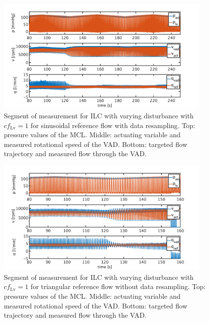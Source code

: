 \begin{figure}[ht!]
  \centering
  \includegraphics[width=0.95\textwidth]{images/chapt_5/ILC/ilc_var_dist_fix_sine.pdf}
  \caption[Segment of measurement for ILC with varying disturbance with $cf_{\mathrm{Lv}}=1$ for sinusoidal reference flow with data resampling]{Segment of measurement for ILC with varying disturbance with $cf_{\mathrm{Lv}}=1$ for sinusoidal reference flow with data resampling. Top:  pressure values of the MCL. Middle: actuating variable and measured rotational speed of the VAD. Bottom: targeted flow trajectory and measured flow through the VAD.}
   \label{fig:anh_10}
\end{figure}

\begin{figure}[ht!]
  \centering
  \includegraphics[width=0.95\textwidth]{images/chapt_5/ILC/ilc_var_dist_unfix_triang.pdf}
  \caption[Segment of measurement for ILC with varying disturbance with $cf_{\mathrm{Lv}}=1$ for triangular reference flow without data resampling]{Segment of measurement for ILC with varying disturbance with $cf_{\mathrm{Lv}}=1$ for triangular reference flow without data resampling. Top:  pressure values of the MCL. Middle: actuating variable and measured rotational speed of the VAD. Bottom: targeted flow trajectory and measured flow through the VAD.}
   \label{fig:anh_11}
\end{figure}

